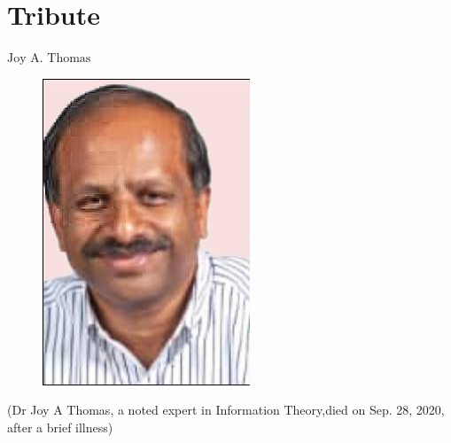 \chapter{Tribute}




\vskip 0.8cm

\begin{center}
{\large\uppercase{$\text{Joy A. Thomas}$}} 


\vskip -6pt

\end{center}

\vskip 2cm




\vfill




\newpage



\begin{figure}[H]
\centering
\includegraphics[scale=2]{src/Figures/fig01.jpg}
\end{figure}


\begin{center}
(Dr Joy A Thomas, a noted expert in Information Theory,\break died on Sep. 28, 2020, after a brief illness)
\end{center}

